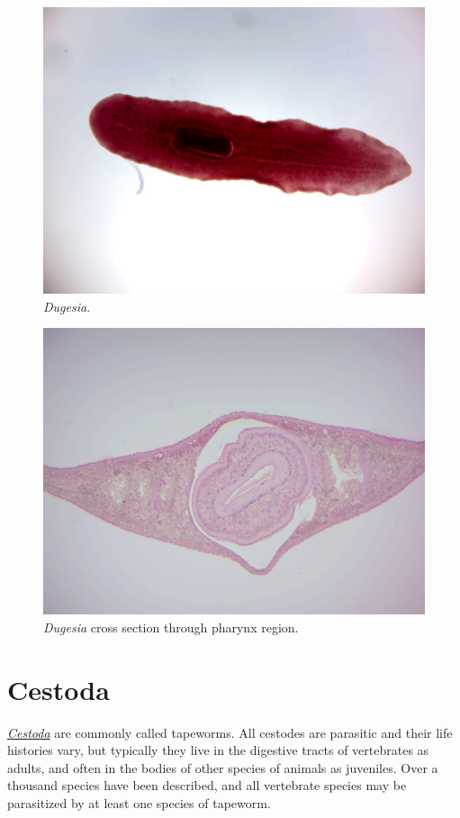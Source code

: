 \begin{figure}

{\centering \includegraphics[width=0.7\linewidth]{./figures/rotifera/dugesia}

}

\caption{\emph{Dugesia}.}\label{fig:dugesia}
\end{figure}

\begin{figure}

{\centering \includegraphics[width=0.7\linewidth]{./figures/rotifera/dugesia_xs}

}

\caption{\emph{Dugesia} cross section through pharynx region.}\label{fig:dugesiaxs}
\end{figure}

\section{Cestoda}\label{cestoda}

\href{https://en.wikipedia.org/wiki/Cestoda}{\emph{Cestoda}} are
commonly called tapeworms. All cestodes are parasitic and their life
histories vary, but typically they live in the digestive tracts of
vertebrates as adults, and often in the bodies of other species of
animals as juveniles. Over a thousand species have been described, and
all vertebrate species may be parasitized by at least one species of
tapeworm.

